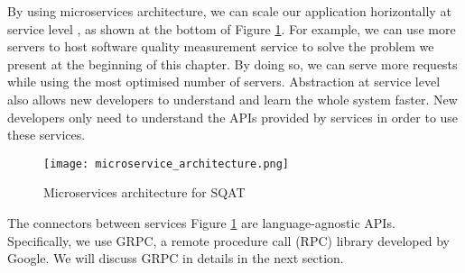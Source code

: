By using microservices architecture, we can scale our application horizontally at service level \cite[]{martinfowler2015}, as shown at the bottom of Figure \ref{figure:microservices_architecture}. For example, we can use more servers to host software quality measurement service to solve the problem we present at the beginning of this chapter. By doing so, we can serve more requests while using the most optimised number of servers. Abstraction at service level also allows new developers to understand and learn the whole system faster. New developers only need to understand the APIs provided by services in order to use these services. 

\begin{figure}[t]
    \centering
    \texttt{[image: microservice\_architecture.png]}
    \caption{Microservices architecture for SQAT}
    \label{figure:microservices_architecture}
\end{figure}



The connectors between services Figure \ref{figure:microservices_architecture} are language-agnostic APIs. Specifically, we use GRPC, a remote procedure call (RPC) library developed by Google. We will discuss GRPC in details in the next section. 

